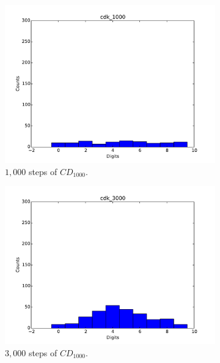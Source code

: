 \begin{figure}[hbt]
\begin{subfigure}[t]{0.18\textwidth}
  			\includegraphics[width=\textwidth]{pics_sdbn/gibbs_cdk_1000.pdf}
  		    \caption{$1,000$ steps of $CD_{1000}$.}
  		\end{subfigure}
  		\begin{subfigure}[t]{0.18\textwidth}
  			\includegraphics[width=\textwidth]{pics_sdbn/gibbs_cdk_3000.pdf}
  		    \caption{$3,000$ steps of $CD_{1000}$.}
  		\end{subfigure}
  		\begin{subfigure}[t]{0.18\textwidth}

\end{subfigure}
\end{figure}
